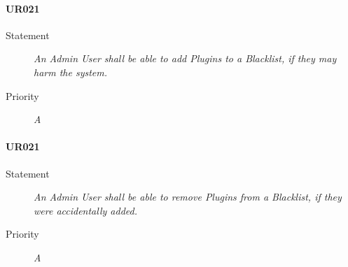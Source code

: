 \paragraph{UR021}
\begin{description}
  \item [Statement] 
    \textit{An \gls{Admin User} shall be able to add \gls{Plugins} to a \gls{Blacklist}, if they may harm the system.}
  \item [Priority] \textit{A}
\end{description}

\paragraph{UR021}
\begin{description}
  \item [Statement] 
    \textit{An \gls{Admin User} shall be able to remove \gls{Plugins} from a \gls{Blacklist}, if they were accidentally added.}
  \item [Priority] \textit{A}
\end{description}
